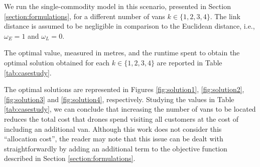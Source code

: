 \documentclass[a4paper,  review, authoryear, 1p.]{elsarticle}
\begin{document}
{		We run the single-commodity model in this scenario,  presented in Section \ref{section:formulations}, for a different number of vans $k\in\{1, 2, 3, 4\}$. The link distance is assumed to be negligible in comparison to the Euclidean distance, i.e., $\omega_E=1$ and $\omega_L=0$. 
		
		The optimal value, measured in metres, and the runtime spent to obtain the optimal solution obtained for each $k\in\{1,2,3,4\}$ are reported in Table \ref{tab:casestudy}. 
		
		\begin{table}[H]
			\centering
			\caption{Optimal solution and runtime for each configuration}
		\end{table}
		
		The optimal solutions are represented in Figures \ref{fig:solution1}, \ref{fig:solution2}, \ref{fig:solution3} and \ref{fig:solution4}, respectively. Studying the values in Table \ref{tab:casestudy}, we can conclude that increasing the number of vans to be located reduces the total cost that drones spend visiting all customers at the cost of including an additional van. Although this work does not consider this ``allocation cost'', the reader may note that this issue can be dealt with straightforwardly by adding an additional term to the objective function described in Section \ref{section:formulations}.
		
}
\end{document}
